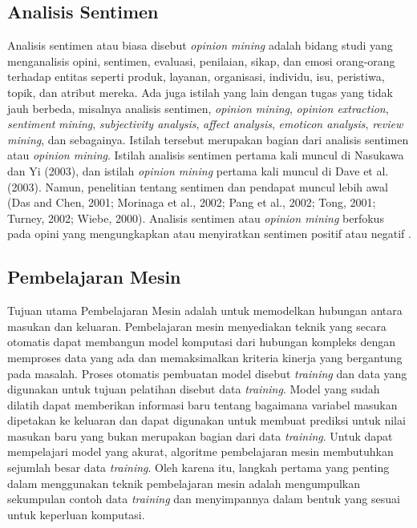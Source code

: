 \subsection{Analisis Sentimen}
Analisis sentimen atau biasa disebut \textit{opinion mining} adalah 
bidang studi yang menganalisis opini, sentimen, evaluasi, penilaian, 
sikap, dan emosi orang-orang terhadap entitas seperti produk, layanan, 
organisasi, individu, isu, peristiwa, topik, dan atribut mereka. Ada 
juga istilah yang lain dengan tugas yang tidak jauh berbeda, misalnya 
analisis sentimen, \textit{opinion mining}, \textit{opinion extraction}, \textit{sentiment} \textit{mining}, \textit{subjectivity analysis}, \textit{affect analysis}, \textit{emoticon analysis}, \textit{review mining}, dan sebagainya. Istilah tersebut merupakan bagian dari analisis sentimen atau \textit{opinion mining}. Istilah analisis sentimen pertama kali muncul di Nasukawa dan Yi (2003), dan istilah \textit{opinion mining }pertama kali muncul di Dave et al. (2003). Namun, penelitian tentang sentimen dan pendapat muncul lebih awal (Das and Chen, 2001; Morinaga et al., 2002; Pang et al., 2002; Tong, 2001; Turney, 2002; Wiebe, 2000). Analisis sentimen atau \textit{opinion mining }berfokus pada opini yang mengungkapkan atau menyiratkan sentimen positif atau negatif \cite{10}.
\subsection{Pembelajaran Mesin}
Tujuan utama Pembelajaran Mesin adalah untuk memodelkan hubungan antara 
masukan dan keluaran. Pembelajaran mesin menyediakan teknik yang secara 
otomatis dapat membangun model komputasi dari hubungan kompleks dengan 
memproses data yang ada dan memaksimalkan kriteria kinerja yang 
bergantung pada masalah. Proses otomatis pembuatan model disebut 
\textit{training} dan data yang digunakan untuk tujuan pelatihan 
disebut data \textit{training}.\textit{ }Model yang sudah dilatih 
dapat memberikan informasi baru tentang bagaimana variabel masukan 
dipetakan ke keluaran dan dapat digunakan untuk membuat prediksi untuk 
nilai masukan baru yang bukan merupakan bagian dari data \textit{training}. Untuk dapat mempelajari model yang akurat, algoritme pembelajaran mesin membutuhkan sejumlah besar data \textit{training}. Oleh karena itu, langkah pertama yang penting dalam menggunakan teknik pembelajaran mesin adalah mengumpulkan sekumpulan contoh data \textit{training }dan menyimpannya dalam bentuk yang sesuai untuk keperluan komputasi.

